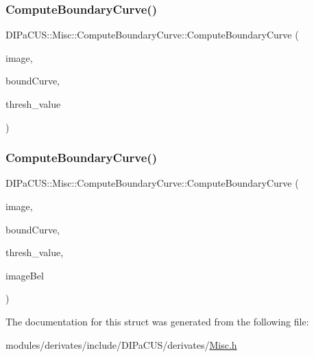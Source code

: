 \subsubsection{\texorpdfstring{Compute\+Boundary\+Curve()}{ComputeBoundaryCurve()}\hspace{0.1cm}{\footnotesize\ttfamily [1/2]}}
{\footnotesize\ttfamily D\+I\+Pa\+C\+U\+S\+::\+Misc\+::\+Compute\+Boundary\+Curve\+::\+Compute\+Boundary\+Curve (\begin{DoxyParamCaption}\item[{const \mbox{\hyperlink{structDIPaCUS_1_1Misc_1_1ComputeBoundaryCurve_a67511f091a6fb85b38f29a4df3f480dd}{Image2D}} \&}]{image,  }\item[{\mbox{\hyperlink{structDIPaCUS_1_1Misc_1_1ComputeBoundaryCurve_ac3d7adcd3d9b37d2166c65346e0916d2}{Curve}} \&}]{bound\+Curve,  }\item[{unsigned int}]{thresh\+\_\+value }\end{DoxyParamCaption})}

\mbox{\label{structDIPaCUS_1_1Misc_1_1ComputeBoundaryCurve_a822855aabf08a913095310ab5a5acfa5}} 
\subsubsection{\texorpdfstring{Compute\+Boundary\+Curve()}{ComputeBoundaryCurve()}\hspace{0.1cm}{\footnotesize\ttfamily [2/2]}}
{\footnotesize\ttfamily D\+I\+Pa\+C\+U\+S\+::\+Misc\+::\+Compute\+Boundary\+Curve\+::\+Compute\+Boundary\+Curve (\begin{DoxyParamCaption}\item[{const \mbox{\hyperlink{structDIPaCUS_1_1Misc_1_1ComputeBoundaryCurve_a67511f091a6fb85b38f29a4df3f480dd}{Image2D}} \&}]{image,  }\item[{\mbox{\hyperlink{structDIPaCUS_1_1Misc_1_1ComputeBoundaryCurve_ac3d7adcd3d9b37d2166c65346e0916d2}{Curve}} \&}]{bound\+Curve,  }\item[{unsigned int}]{thresh\+\_\+value,  }\item[{\mbox{\hyperlink{structDIPaCUS_1_1Misc_1_1ComputeBoundaryCurve_affd97ae2b7fea729fca28c9a4bb16fd5}{S\+Cell}}}]{image\+Bel }\end{DoxyParamCaption})}



The documentation for this struct was generated from the following file\+:\begin{DoxyCompactItemize}
\item 
modules/derivates/include/\+D\+I\+Pa\+C\+U\+S/derivates/\mbox{\hyperlink{Misc_8h}{Misc.\+h}}\end{DoxyCompactItemize}
